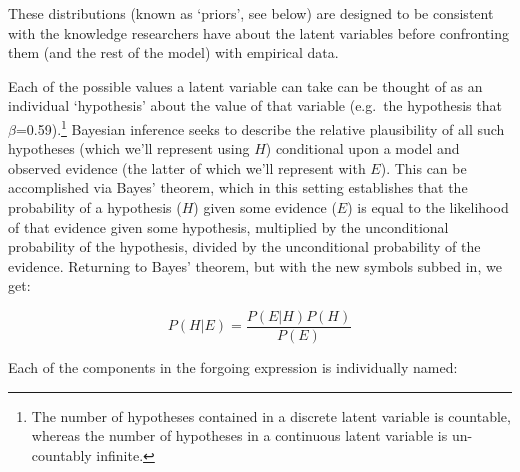 \documentclass[
  12pt,
  a4paper,
  DIV=11,
  numbers=noendperiod,
  twoside,
  open=any]{scrartcl}
\begin{document}
These distributions (known as `priors', see below) are designed to be
consistent with the knowledge researchers have about the latent
variables before confronting them (and the rest of the model) with
empirical data.

Each of the possible values a latent variable can take can be thought of
as an individual `hypothesis' about the value of that variable (e.g.~the
hypothesis that \(β\)=0.59).\footnote{The number of hypotheses contained
  in a discrete latent variable is countable, whereas the number of
  hypotheses in a continuous latent variable is un-countably infinite.}
Bayesian inference seeks to describe the relative plausibility of all
such hypotheses (which we'll represent using \(H\)) conditional upon a
model and observed evidence (the latter of which we'll represent with
\(E\)). This can be accomplished via Bayes' theorem, which in this
setting establishes that the probability of a hypothesis (\(H\)) given
some evidence (\(E\)) is equal to the likelihood of that evidence given
some hypothesis, multiplied by the unconditional probability of the
hypothesis, divided by the unconditional probability of the evidence.
Returning to Bayes' theorem, but with the new symbols subbed in, we get:

\[
P(H|E)=\frac{P(E|H)P(H)}{P(E)} 
\]

Each of the components in the forgoing expression is individually named:
\end{document}
